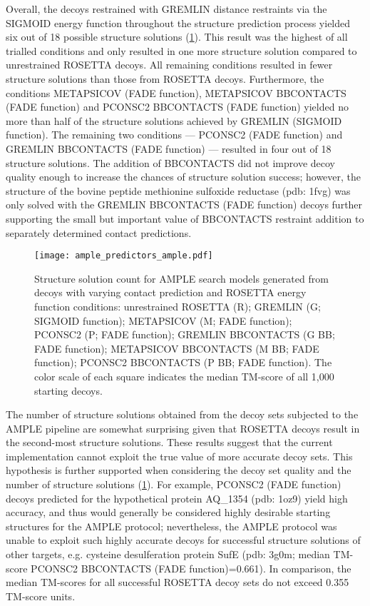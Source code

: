 Overall, the decoys restrained with GREMLIN distance restraints via the SIGMOID energy function throughout the structure prediction process yielded six out of 18 possible structure solutions (\cref{fig:ample_predictor_ample}). This result was the highest of all trialled conditions and only resulted in one more structure solution compared to unrestrained ROSETTA decoys. All remaining conditions resulted in fewer structure solutions than those from ROSETTA decoys. Furthermore, the conditions METAPSICOV (FADE function), METAPSICOV BBCONTACTS (FADE function) and PCONSC2 BBCONTACTS (FADE function) yielded no more than half of the structure solutions achieved by GREMLIN (SIGMOID function). The remaining two conditions --- PCONSC2 (FADE function) and GREMLIN BBCONTACTS (FADE function) --- resulted in four out of 18 structure solutions. The addition of BBCONTACTS did not improve decoy quality enough to increase the chances of structure solution success; however, the structure of the bovine peptide methionine sulfoxide reductase (\gls{pdb}: 1fvg) was only solved with the GREMLIN BBCONTACTS (FADE function) decoys further supporting the small but important value of BBCONTACTS restraint addition to separately determined contact predictions.

\begin{figure}[H]
    \centering
    \texttt{[image: ample\_predictors\_ample.pdf]}
    \caption[Structure solution count forom AMPLE-derived search models]{Structure solution count for AMPLE search models generated from decoys with varying contact prediction and ROSETTA energy function conditions: unrestrained ROSETTA (R); GREMLIN (G; SIGMOID function); METAPSICOV (M; FADE function); PCONSC2  (P; FADE function); GREMLIN BBCONTACTS (G BB; FADE function); METAPSICOV BBCONTACTS (M BB; FADE function); PCONSC2 BBCONTACTS (P BB; FADE function). The color scale of each square indicates the median TM-score of all 1,000 starting decoys.}
    \label{fig:ample_predictor_ample}
\end{figure}

The number of structure solutions obtained from the decoy sets subjected to the AMPLE pipeline are somewhat surprising given that ROSETTA decoys result in the second-most structure solutions. These results suggest that the current implementation cannot exploit the true value of more accurate decoy sets. This hypothesis is further supported when considering the decoy set quality and the number of structure solutions (\cref{fig:ample_predictor_ample}). For example, PCONSC2 (FADE function) decoys predicted for the hypothetical protein AQ\_1354 (\gls{pdb}: 1oz9) yield high accuracy, and thus would generally be considered highly desirable starting structures for the AMPLE protocol; nevertheless, the AMPLE protocol was unable to exploit such highly accurate decoys for successful structure solutions of other targets, e.g. cysteine desulferation protein SufE (\gls{pdb}: 3g0m; median TM-score PCONSC2 BBCONTACTS (FADE function)=0.661). In comparison, the median TM-scores for all successful ROSETTA decoy sets do not exceed 0.355 TM-score units.


